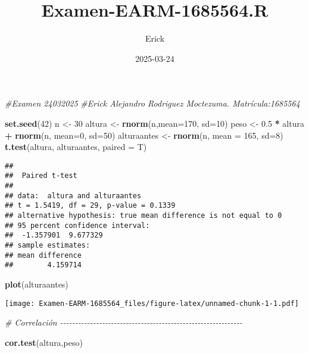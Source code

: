 \documentclass[
]{article}
\title{Examen-EARM-1685564.R}
\author{Erick}
\date{2025-03-24}
\newenvironment{Shaded}{\begin{snugshade}}{\end{snugshade}}
\newcommand{\AttributeTok}[1]{\textcolor[rgb]{0.13,0.29,0.53}{#1}}
\newcommand{\CommentTok}[1]{\textcolor[rgb]{0.56,0.35,0.01}{\textit{#1}}}
\newcommand{\DecValTok}[1]{\textcolor[rgb]{0.00,0.00,0.81}{#1}}
\newcommand{\FloatTok}[1]{\textcolor[rgb]{0.00,0.00,0.81}{#1}}
\newcommand{\FunctionTok}[1]{\textcolor[rgb]{0.13,0.29,0.53}{\textbf{#1}}}
\newcommand{\NormalTok}[1]{#1}
\newcommand{\OtherTok}[1]{\textcolor[rgb]{0.56,0.35,0.01}{#1}}
\newcommand{\SpecialCharTok}[1]{\textcolor[rgb]{0.81,0.36,0.00}{\textbf{#1}}}
\begin{document}
\maketitle

\begin{Shaded}
\begin{Highlighting}[]
\CommentTok{\#Examen 24032025}
\CommentTok{\#Erick Alejandro Rodriguez Moctezuma. Matrícula:1685564}

\FunctionTok{set.seed}\NormalTok{(}\DecValTok{42}\NormalTok{)}
\NormalTok{n }\OtherTok{\textless{}{-}} \DecValTok{30}
\NormalTok{altura }\OtherTok{\textless{}{-}} \FunctionTok{rnorm}\NormalTok{(n,}\AttributeTok{mean=}\DecValTok{170}\NormalTok{, }\AttributeTok{sd=}\DecValTok{10}\NormalTok{)}
\NormalTok{peso }\OtherTok{\textless{}{-}} \FloatTok{0.5} \SpecialCharTok{*}\NormalTok{ altura }\SpecialCharTok{+} \FunctionTok{rnorm}\NormalTok{(n, }\AttributeTok{mean=}\DecValTok{0}\NormalTok{, }\AttributeTok{sd=}\DecValTok{50}\NormalTok{)}
\NormalTok{alturaantes }\OtherTok{\textless{}{-}} \FunctionTok{rnorm}\NormalTok{(n, }\AttributeTok{mean =} \DecValTok{165}\NormalTok{, }\AttributeTok{sd=}\DecValTok{8}\NormalTok{)}
\FunctionTok{t.test}\NormalTok{(altura, alturaantes, }\AttributeTok{paired =}\NormalTok{ T)}
\end{Highlighting}
\end{Shaded}

\begin{verbatim}
## 
##  Paired t-test
## 
## data:  altura and alturaantes
## t = 1.5419, df = 29, p-value = 0.1339
## alternative hypothesis: true mean difference is not equal to 0
## 95 percent confidence interval:
##  -1.357901  9.677329
## sample estimates:
## mean difference 
##        4.159714
\end{verbatim}

\begin{Shaded}
\begin{Highlighting}[]
\FunctionTok{plot}\NormalTok{(alturaantes)}
\end{Highlighting}
\end{Shaded}

\texttt{[image: Examen-EARM-1685564\_files/figure-latex/unnamed-chunk-1-1.pdf]}

\begin{Shaded}
\begin{Highlighting}[]
\CommentTok{\# Correlación {-}{-}{-}{-}{-}{-}{-}{-}{-}{-}{-}{-}{-}{-}{-}{-}{-}{-}{-}{-}{-}{-}{-}{-}{-}{-}{-}{-}{-}{-}{-}{-}{-}{-}{-}{-}{-}{-}{-}{-}{-}{-}{-}{-}{-}{-}{-}{-}{-}{-}{-}{-}{-}{-}{-}{-}{-}{-}{-}{-}{-}}

\FunctionTok{cor.test}\NormalTok{(altura,peso)}
\end{Highlighting}
\end{Shaded}
\end{document}
